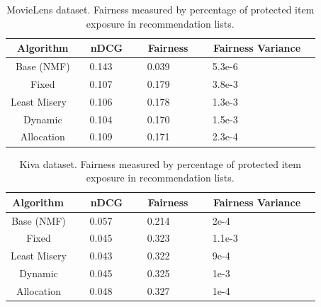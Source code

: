 \begin{table}[htb]
    \centering
    \begin{tabular}{c|l|l|l}
       Algorithm  & \ nDCG \ & \ Fairness \  & \ Fairness Variance \ \\
       \hline
       Base (NMF)       & \ 0.143 & \ 0.039 & \ 5.3e-6 \  \\
       Fixed            & \ 0.107 & \ 0.179 & \ 3.8e-3 \ \\
       Least Misery \   & \ 0.106 & \ 0.178 & \ 1.3e-3 \ \\
       Dynamic          & \ 0.104 & \ 0.170 & \ 1.5e-3 \ \\
       Allocation       & \ 0.109 & \ 0.171 & \ 2.3e-4 \ \\
    \end{tabular}
    \caption{MovieLens dataset. Fairness measured by percentage of protected item exposure in recommendation lists.}
    \label{tab:overall-ML}
\end{table}


\begin{table}[htb]
    \centering
    \begin{tabular}{c|l|l|l}
       Algorithm  \ & \ nDCG \ & \ Fairness \ & \ Fairness Variance \ \\
       \hline
       Base (NMF)   \ & \ 0.057 & \ 0.214 & \ 2e-4\\
       Fixed        \ & \ 0.045 & \ 0.323 & \ 1.1e-3\\
       Least Misery \ & \ 0.043 & \ 0.322 & \ 9e-4\\
       Dynamic      \ & \ 0.045 & \ 0.325 & \ 1e-3\\
       Allocation   \ & \ 0.048 & \ 0.327 & \ 1e-4\\
    \end{tabular}
    \caption{Kiva dataset. Fairness measured by percentage of protected item exposure in recommendation lists.}
    \label{tab:overall-Kiva}
\end{table}


